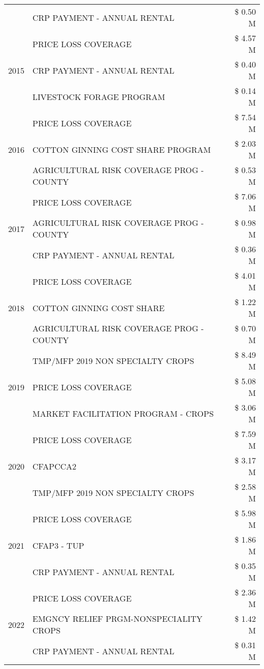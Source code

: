 \begin{tabular}{llr}
 & CRP PAYMENT - ANNUAL RENTAL & \$ 0.50 M \\
\cline{1-3}
\multirow[t]{3}{*}{2015} & PRICE LOSS COVERAGE & \$ 4.57 M \\
 & CRP PAYMENT - ANNUAL RENTAL & \$ 0.40 M \\
 & LIVESTOCK FORAGE PROGRAM & \$ 0.14 M \\
\cline{1-3}
\multirow[t]{3}{*}{2016} & PRICE LOSS COVERAGE & \$ 7.54 M \\
 & COTTON GINNING COST SHARE PROGRAM & \$ 2.03 M \\
 & AGRICULTURAL RISK COVERAGE PROG - COUNTY & \$ 0.53 M \\
\cline{1-3}
\multirow[t]{3}{*}{2017} & PRICE LOSS COVERAGE & \$ 7.06 M \\
 & AGRICULTURAL RISK COVERAGE PROG - COUNTY & \$ 0.98 M \\
 & CRP PAYMENT - ANNUAL RENTAL & \$ 0.36 M \\
\cline{1-3}
\multirow[t]{3}{*}{2018} & PRICE LOSS COVERAGE & \$ 4.01 M \\
 & COTTON GINNING COST SHARE & \$ 1.22 M \\
 & AGRICULTURAL RISK COVERAGE PROG - COUNTY & \$ 0.70 M \\
\cline{1-3}
\multirow[t]{3}{*}{2019} & TMP/MFP 2019 NON SPECIALTY CROPS & \$ 8.49 M \\
 & PRICE LOSS COVERAGE & \$ 5.08 M \\
 & MARKET FACILITATION PROGRAM - CROPS & \$ 3.06 M \\
\cline{1-3}
\multirow[t]{3}{*}{2020} & PRICE LOSS COVERAGE & \$ 7.59 M \\
 & CFAPCCA2 & \$ 3.17 M \\
 & TMP/MFP 2019 NON SPECIALTY CROPS & \$ 2.58 M \\
\cline{1-3}
\multirow[t]{3}{*}{2021} & PRICE LOSS COVERAGE & \$ 5.98 M \\
 & CFAP3 - TUP & \$ 1.86 M \\
 & CRP PAYMENT - ANNUAL RENTAL & \$ 0.35 M \\
\cline{1-3}
\multirow[t]{3}{*}{2022} & PRICE LOSS COVERAGE & \$ 2.36 M \\
 & EMGNCY RELIEF PRGM-NONSPECIALITY CROPS & \$ 1.42 M \\
 & CRP PAYMENT - ANNUAL RENTAL & \$ 0.31 M \\
\cline{1-3}
\bottomrule
\end{tabular}
